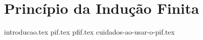 \chapter{Princípio da Indução Finita}
{
    \newcommand{\chapterdir}{../capitulos/principio-da-inducao-finita/}

    {introducao.tex}
    {pif.tex}
    {pfif.tex}
    {cuidados-ao-usar-o-pif.tex}
}
